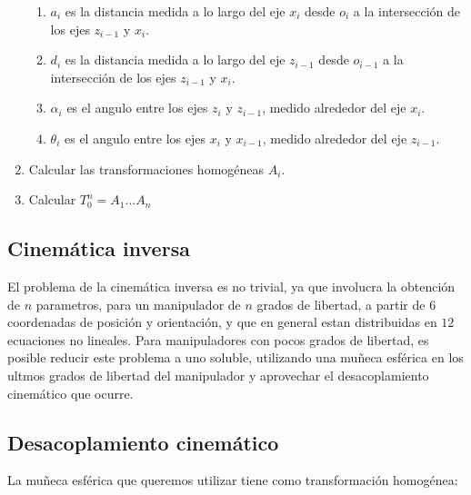 \begin{multicols*}{2}
\begin{enumerate}
                \begin{enumerate}
                    \item $a_i$ es la distancia medida a lo largo del eje $x_i$ desde $o_i$ a la intersección de los ejes $z_{i-1}$ y $x_i$.
                    \item $d_i$ es la distancia medida a lo largo del eje $z_{i-1}$ desde $o_{i-1}$ a la intersección de los ejes $z_{i-1}$ y $x_i$.
                    \item $\alpha_i$ es el angulo entre los ejes $z_i$ y $z_{i-1}$, medido alrededor del eje $x_i$.
                    \item $\theta_i$ es el angulo entre los ejes $x_i$ y $x_{i-1}$, medido alrededor del eje $z_{i-1}$.
                \end{enumerate}
                \item Calcular las transformaciones homogéneas $A_i$.
                \item Calcular $T_0^n = A_1 \dots A_n$
            \end{enumerate}


        \subsection{Cinemática inversa}

            El problema de la cinemática inversa es no trivial, ya que involucra la obtención de $n$ parametros, para un manipulador de $n$ grados de libertad, a partir de $6$ coordenadas de posición y orientación, y que en general estan distribuidas en $12$ ecuaciones no lineales. Para manipuladores con pocos grados de libertad, es posible reducir este problema a uno soluble, utilizando una muñeca esférica en los ultmos grados de libertad del manipulador y aprovechar el desacoplamiento cinemático que ocurre.


        \subsection{Desacoplamiento cinemático}

            La muñeca esférica que queremos utilizar tiene como transformación homogénea:


\end{multicols*}
